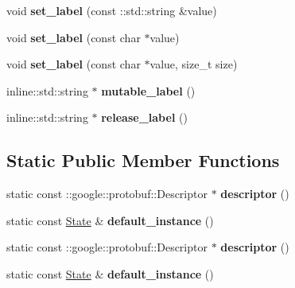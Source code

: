 \begin{DoxyCompactItemize}
\item 
\hypertarget{classgraph_1_1State_aafc8a32bff5a6e4b8702d00b0963e12d}{
void {\bfseries set\_\-label} (const ::std::string \&value)}
\label{classgraph_1_1State_aafc8a32bff5a6e4b8702d00b0963e12d}

\item 
\hypertarget{classgraph_1_1State_a501eea62783e326dcabf304efe3776e6}{
void {\bfseries set\_\-label} (const char $\ast$value)}
\label{classgraph_1_1State_a501eea62783e326dcabf304efe3776e6}

\item 
\hypertarget{classgraph_1_1State_a429836f891cab177ebbc26b4631c554a}{
void {\bfseries set\_\-label} (const char $\ast$value, size\_\-t size)}
\label{classgraph_1_1State_a429836f891cab177ebbc26b4631c554a}

\item 
\hypertarget{classgraph_1_1State_aaab551134a99085aae249d9775dd5669}{
inline::std::string $\ast$ {\bfseries mutable\_\-label} ()}
\label{classgraph_1_1State_aaab551134a99085aae249d9775dd5669}

\item 
\hypertarget{classgraph_1_1State_ac45e9075ffe1302d36974886e4d725f3}{
inline::std::string $\ast$ {\bfseries release\_\-label} ()}
\label{classgraph_1_1State_ac45e9075ffe1302d36974886e4d725f3}

\end{DoxyCompactItemize}
\subsection*{Static Public Member Functions}
\begin{DoxyCompactItemize}
\item 
\hypertarget{classgraph_1_1State_a84099504e494d0d9ba226d60bd8e5db7}{
static const ::google::protobuf::Descriptor $\ast$ {\bfseries descriptor} ()}
\label{classgraph_1_1State_a84099504e494d0d9ba226d60bd8e5db7}

\item 
\hypertarget{classgraph_1_1State_a3b976f5020643cda46f45404a5838acf}{
static const \hyperlink{classgraph_1_1State}{State} \& {\bfseries default\_\-instance} ()}
\label{classgraph_1_1State_a3b976f5020643cda46f45404a5838acf}

\item 
\hypertarget{classgraph_1_1State_a3e8f14326a5b160291b2dc219270d685}{
static const ::google::protobuf::Descriptor $\ast$ {\bfseries descriptor} ()}
\label{classgraph_1_1State_a3e8f14326a5b160291b2dc219270d685}

\item 
\hypertarget{classgraph_1_1State_a585b25fdad9a4a8fccbab2d0274ce292}{
static const \hyperlink{classgraph_1_1State}{State} \& {\bfseries default\_\-instance} ()}
\label{classgraph_1_1State_a585b25fdad9a4a8fccbab2d0274ce292}

\end{DoxyCompactItemize}
